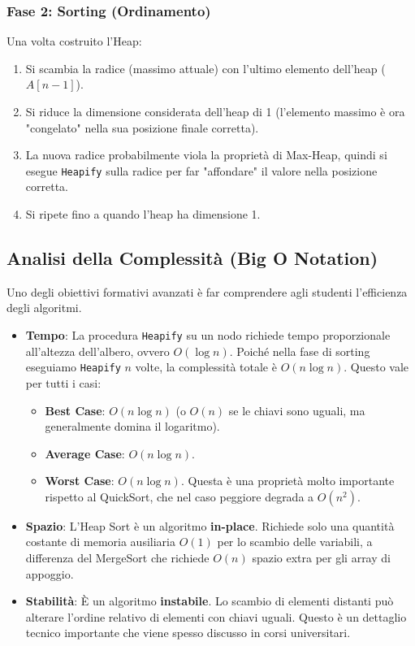 \documentclass[openany]{theme/uniprthesis}
\begin{document}
\subsubsection{Fase 2: Sorting (Ordinamento)}
Una volta costruito l'Heap:
\begin{enumerate}
    \item Si scambia la radice (massimo attuale) con l'ultimo elemento dell'heap ($A[n-1]$).
    \item Si riduce la dimensione considerata dell'heap di 1 (l'elemento massimo è ora "congelato" nella sua posizione finale corretta).
    \item La nuova radice probabilmente viola la proprietà di Max-Heap, quindi si esegue \texttt{Heapify} sulla radice per far "affondare" il valore nella posizione corretta.
    \item Si ripete fino a quando l'heap ha dimensione 1.
\end{enumerate}

\subsection{Analisi della Complessità (Big O Notation)}
Uno degli obiettivi formativi avanzati è far comprendere agli studenti l'efficienza degli algoritmi.
\begin{itemize}
    \item \textbf{Tempo}: La procedura \texttt{Heapify} su un nodo richiede tempo proporzionale all'altezza dell'albero, ovvero $O(\log n)$. Poiché nella fase di sorting eseguiamo \texttt{Heapify} $n$ volte, la complessità totale è $O(n \log n)$.
    Questo vale per tutti i casi:
    \begin{itemize}
        \item \textbf{Best Case}: $O(n \log n)$ (o $O(n)$ se le chiavi sono uguali, ma generalmente domina il logaritmo).
        \item \textbf{Average Case}: $O(n \log n)$.
        \item \textbf{Worst Case}: $O(n \log n)$. Questa è una proprietà molto importante rispetto al QuickSort, che nel caso peggiore degrada a $O(n^2)$.
    \end{itemize}
    \item \textbf{Spazio}: L'Heap Sort è un algoritmo \textbf{in-place}. Richiede solo una quantità costante di memoria ausiliaria $O(1)$ per lo scambio delle variabili, a differenza del MergeSort che richiede $O(n)$ spazio extra per gli array di appoggio.
    \item \textbf{Stabilità}: È un algoritmo \textbf{instabile}. Lo scambio di elementi distanti può alterare l'ordine relativo di elementi con chiavi uguali. Questo è un dettaglio tecnico importante che viene spesso discusso in corsi universitari.
\end{itemize}
\end{document}
